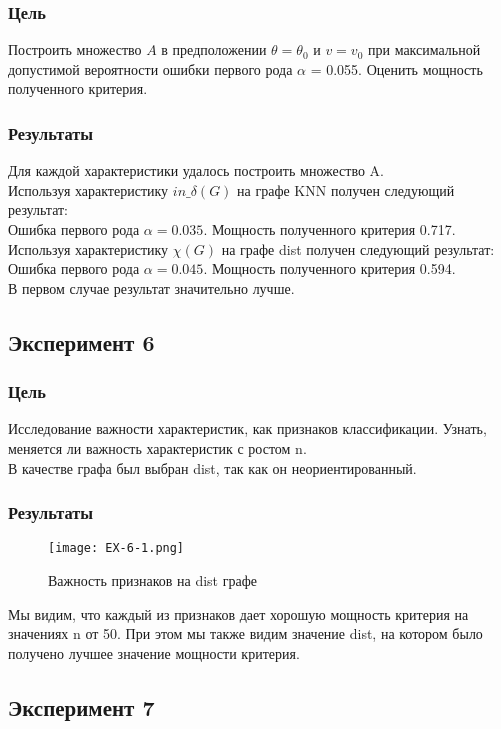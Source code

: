 \documentclass[a4paper, 12pt]{article}
\begin{document}
\subsubsection{Цель}
Построить множество $A$ в предположении $\theta = \theta_0$ и $v = v_0$ при максимальной допустимой вероятности ошибки первого рода $\alpha$ = 0.055.
Оценить мощность полученного критерия.
\subsubsection{Результаты}
Для каждой характеристики удалось построить множество A.\\
Используя характеристику $in\_\delta(G)$ на графе KNN получен следующий результат:\\
Ошибка первого рода $\alpha = 0.035.$ Мощность полученного критерия 0.717.\\
Используя характеристику $\chi(G)$ на графе dist получен следующий результат:\\
Ошибка первого рода $\alpha = 0.045.$ Мощность полученного критерия 0.594.\\
В первом случае результат значительно лучше.\\

\subsection{Эксперимент 6}
\subsubsection{Цель}
Исследование важности характеристик, как признаков классификации. Узнать, меняется ли важность характеристик с ростом n.\\
В качестве графа был выбран dist, так как он неориентированный.\\
\subsubsection{Результаты}
\begin{figure}[H]
    \centering
    \texttt{[image: EX-6-1.png]}
    \caption{Важность признаков на dist графе}
    \label{fig:uml}
\end{figure}
Мы видим, что каждый из признаков дает хорошую мощность критерия на значениях n от 50. При этом мы также видим значение dist, на котором было получено лучшее значение мощности критерия. 

\subsection{Эксперимент 7}
\end{document}
